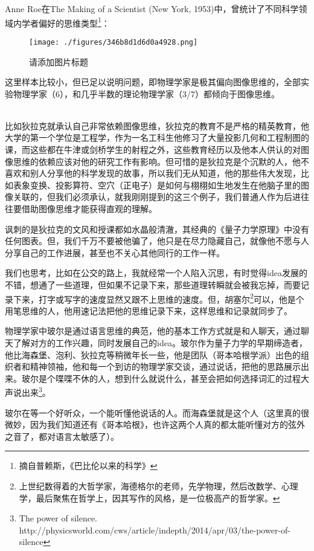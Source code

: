 Anne Roe在The Making of a Scientist (New York, 1953)中，曾统计了不同科学领域内学者偏好的思维类型\footnote{摘自普赖斯，《巴比伦以来的科学》}：

\begin{figure}[ht]
\centering
\texttt{[image: ./figures/346b8d1d6d0a4928.png]}
\caption{请添加图片标题} \label{fig_QMPre2_1}
\end{figure}
这里样本比较小，但已足以说明问题，即物理学家是极其偏向图像思维的，全部实验物理学家（6），和几乎半数的理论物理学家（3/7）都倾向于图像思维。\\


~

比如狄拉克就承认自己非常依赖图像思维，狄拉克的教育不是严格的精英教育，他大学的第一个学位是工程学，作为一名工科生他修习了大量投影几何和工程制图的课，而这些都在牛津或剑桥学生的射程之外，这些教育经历以及他本人供认的对图像思维的依赖应该对他的研究工作有影响。但可惜的是狄拉克是个沉默的人，他不喜欢和别人分享他的科学发现的故事，所以我们无从知道，他的那些伟大发现，比如表象变换、投影算符、空穴（正电子）是如何与栩栩如生地发生在他脑子里的图像关联的，但我们必须承认，就我刚刚提到的这三个例子，我们普通人作为后进往往要借助图像思维才能获得直观的理解。

讽刺的是狄拉克的文风和授课都如水晶般清澈，其经典的《量子力学原理》中没有任何图表。但，我们千万不要被他骗了，他只是在尽力隐藏自己，就像他不愿与人分享自己的工作进展，甚至也不关心其他同行的工作一样。

我们也思考，比如在公交的路上，我就经常一个人陷入沉思，有时觉得idea发展的不错，想通了一些道理，但如果不记录下来，那些道理转瞬就会被我忘掉，而要记录下来，打字或写字的速度显然又跟不上思维的速度。但，胡塞尔\footnote{上世纪数得着的大哲学家，海德格尔的老师，先学物理，然后改数学、心理学，最后聚焦在哲学上，因其写作的风格，是一位极高产的哲学家。}可以，他是个用笔思维的人，他用速记法把他的思维记录下来，这样思维和记录就同步了。

物理学家中玻尔是通过语言思维的典范，他的基本工作方式就是和人聊天，通过聊天了解对方的工作兴趣，同时发展自己的idea。玻尔作为量子力学的早期缔造者，他比海森堡、泡利、狄拉克等稍微年长一些，他是团队（哥本哈根学派）出色的组织者和精神领袖，他和每一个到访的物理学家交谈，通过说话，把他的思路展示出来。玻尔是个喋喋不休的人，想到什么就说什么，甚至会把如何选择词汇的过程大声说出来\footnote{The power of silence. {http://physicsworld.com/cws/article/indepth/2014/apr/03/the-power-of-silence}}。

玻尔在等一个好听众，一个能听懂他说话的人。而海森堡就是这个人（这里真的很微妙，因为我们知道还有《哥本哈根》，也许这两个人真的都太能听懂对方的弦外之音了，都对语言太敏感了）。

